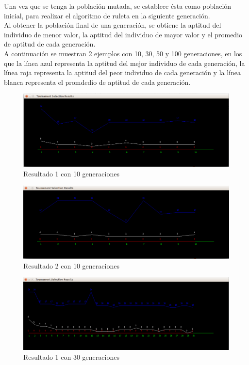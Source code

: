 \documentclass[11pt,letterpaper]{article}
\begin{document}
Una vez que se tenga la población mutada, se establece ésta como población inicial, para realizar el algoritmo de ruleta en la siguiente generación.\\

Al obtener la población final de una generación, se obtiene la aptitud del individuo de menor valor, la aptitud del individuo de mayor valor y el promedio de aptitud de cada generación.\\

A continuación se muestran 2 ejemplos con 10, 30, 50 y 100 generaciones, en los que la línea azul representa la aptitud del mejor individuo de cada generación, la línea roja representa la aptitud del peor individuo de cada generación y la línea blanca representa el promdedio de aptitud de cada generación.
\begin{figure}[H]
	\centering
	\includegraphics[scale = 0.4]{images/10gen1}
	\caption{Resultado 1 con 10 generaciones}
\end{figure}

\begin{figure}[H]
	\centering
	\includegraphics[scale = 0.4]{images/10gen2}
	\caption{Resultado 2 con 10 generaciones}
\end{figure}

\begin{figure}[H]
	\centering
	\includegraphics[scale = 0.4]{images/30gen1}
	\caption{Resultado 1 con 30 generaciones}
\end{figure}
\end{document}
